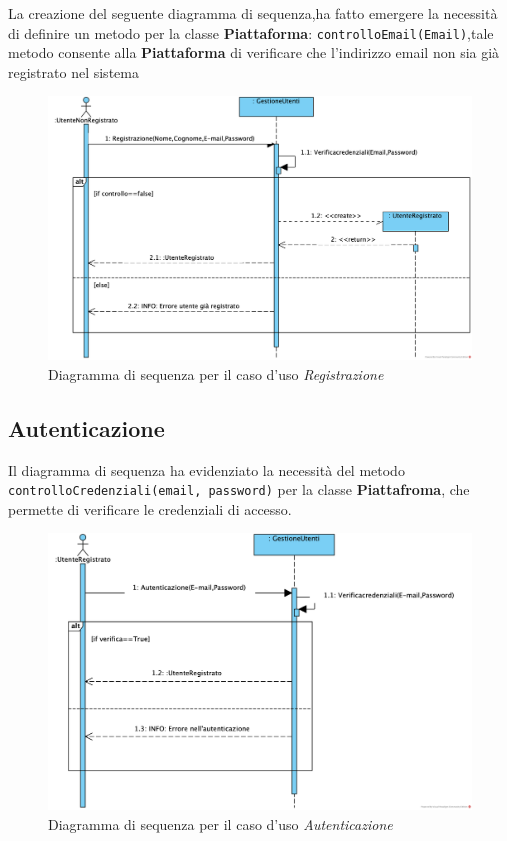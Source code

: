La creazione del seguente diagramma di sequenza,ha fatto emergere la necessità di definire un metodo per la classe \textbf{Piattaforma}:
\texttt{controlloEmail(Email)},tale metodo consente alla \textbf{Piattaforma} di verificare che l'indirizzo email non sia già registrato nel sistema
\begin{figure}[H]
    \centering
    \includegraphics[width=0.8\linewidth]{assets/casid'uso/Registrazione.png}
    \caption{Diagramma di sequenza per il caso d'uso \emph{Registrazione}}
    \label{fig:registrazione}
\end{figure}

\subsection{Autenticazione}
Il diagramma di sequenza ha evidenziato la necessità del metodo \texttt{controlloCredenziali(email, password)} per la classe \textbf{Piattafroma}, che permette di verificare le credenziali di accesso.
\begin{figure}[H]
    \hspace{4cm}
    \includegraphics[width=0.8\linewidth]{assets/casid'uso/Autenticazione.png}
    \caption{Diagramma di sequenza per il caso d'uso \emph{Autenticazione}}
    \label{fig:autenticazione}
\end{figure}

